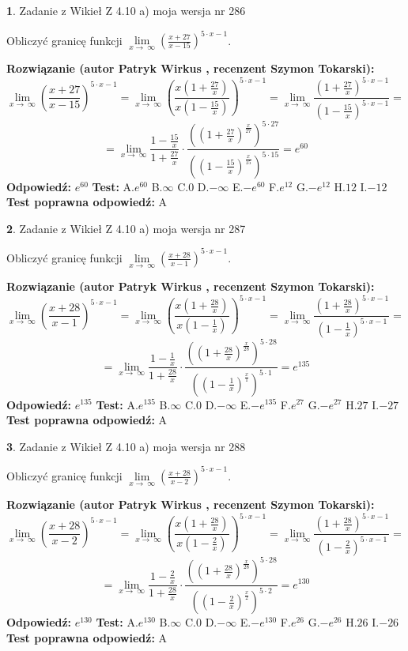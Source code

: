 \documentclass[12pt, a4paper]{article}
\theoremstyle{definition} %
\newtheorem{zad}{}
\newcommand{\zadStart}[1]{\begin{zad}#1\newline}
\newcommand{\zadStop}{\end{zad}}
\newcommand{\rozwStart}[2]{\noindent \textbf{Rozwiązanie (autor #1 , recenzent #2): }\newline}
\newcommand{\rozwStop}{\newline}
\newcommand{\odpStart}{\noindent \textbf{Odpowiedź:}\newline}
\newcommand{\odpStop}{\newline}
\newcommand{\testStart}{\noindent \textbf{Test:}\newline}
\newcommand{\testStop}{\newline}
\newcommand{\kluczStart}{\noindent \textbf{Test poprawna odpowiedź:}\newline}
\newcommand{\kluczStop}{\newline}
\begin{document}
\zadStart{Zadanie z Wikieł Z 4.10 a) moja wersja nr 286}

Obliczyć granicę funkcji  $\lim\limits_{x\to\ \infty}(\frac{x+27}{x-15})^{5\cdot x-1}$.
\zadStop
\rozwStart{Patryk Wirkus}{Szymon Tokarski}
$$\lim\limits_{x\to\ \infty}(\frac{x+27}{x-15})^{5\cdot x-1} = \lim\limits_{x\to\ \infty}(\frac{x(1+\frac{27}{x})}{x(1-\frac{15}{x})})^{5\cdot x-1}=\lim\limits_{x\to\ \infty}\frac{(1+\frac{27}{x})^{5\cdot x-1}}{(1-\frac{15}{x})^{5\cdot x-1}}=$$
$$=\lim\limits_{x\to\ \infty}\frac{1-\frac{15}{x}}{1+\frac{27}{x}}\cdot\frac{((1+\frac{27}{x})^{\frac{x}{27}})^{5\cdot27}}{((1-\frac{15}{x})^{\frac{x}{15}})^{5\cdot15}}=e^{60}$$
\rozwStop
\odpStart
$e^{60}$
\odpStop
\testStart
A.$e^{60}$ B.$\infty$ C.$0$ D.$-\infty$ E.$-e^{60}$
F.$e^{12}$ G.$-e^{12}$
H.$12$
I.$-12$
\testStop
\kluczStart
A
\kluczStop



\zadStart{Zadanie z Wikieł Z 4.10 a) moja wersja nr 287}

Obliczyć granicę funkcji  $\lim\limits_{x\to\ \infty}(\frac{x+28}{x-1})^{5\cdot x-1}$.
\zadStop
\rozwStart{Patryk Wirkus}{Szymon Tokarski}
$$\lim\limits_{x\to\ \infty}(\frac{x+28}{x-1})^{5\cdot x-1} = \lim\limits_{x\to\ \infty}(\frac{x(1+\frac{28}{x})}{x(1-\frac{1}{x})})^{5\cdot x-1}=\lim\limits_{x\to\ \infty}\frac{(1+\frac{28}{x})^{5\cdot x-1}}{(1-\frac{1}{x})^{5\cdot x-1}}=$$
$$=\lim\limits_{x\to\ \infty}\frac{1-\frac{1}{x}}{1+\frac{28}{x}}\cdot\frac{((1+\frac{28}{x})^{\frac{x}{28}})^{5\cdot28}}{((1-\frac{1}{x})^{\frac{x}{1}})^{5\cdot1}}=e^{135}$$
\rozwStop
\odpStart
$e^{135}$
\odpStop
\testStart
A.$e^{135}$ B.$\infty$ C.$0$ D.$-\infty$ E.$-e^{135}$
F.$e^{27}$ G.$-e^{27}$
H.$27$
I.$-27$
\testStop
\kluczStart
A
\kluczStop



\zadStart{Zadanie z Wikieł Z 4.10 a) moja wersja nr 288}

Obliczyć granicę funkcji  $\lim\limits_{x\to\ \infty}(\frac{x+28}{x-2})^{5\cdot x-1}$.
\zadStop
\rozwStart{Patryk Wirkus}{Szymon Tokarski}
$$\lim\limits_{x\to\ \infty}(\frac{x+28}{x-2})^{5\cdot x-1} = \lim\limits_{x\to\ \infty}(\frac{x(1+\frac{28}{x})}{x(1-\frac{2}{x})})^{5\cdot x-1}=\lim\limits_{x\to\ \infty}\frac{(1+\frac{28}{x})^{5\cdot x-1}}{(1-\frac{2}{x})^{5\cdot x-1}}=$$
$$=\lim\limits_{x\to\ \infty}\frac{1-\frac{2}{x}}{1+\frac{28}{x}}\cdot\frac{((1+\frac{28}{x})^{\frac{x}{28}})^{5\cdot28}}{((1-\frac{2}{x})^{\frac{x}{2}})^{5\cdot2}}=e^{130}$$
\rozwStop
\odpStart
$e^{130}$
\odpStop
\testStart
A.$e^{130}$ B.$\infty$ C.$0$ D.$-\infty$ E.$-e^{130}$
F.$e^{26}$ G.$-e^{26}$
H.$26$
I.$-26$
\testStop
\kluczStart
A
\kluczStop
\end{document}
